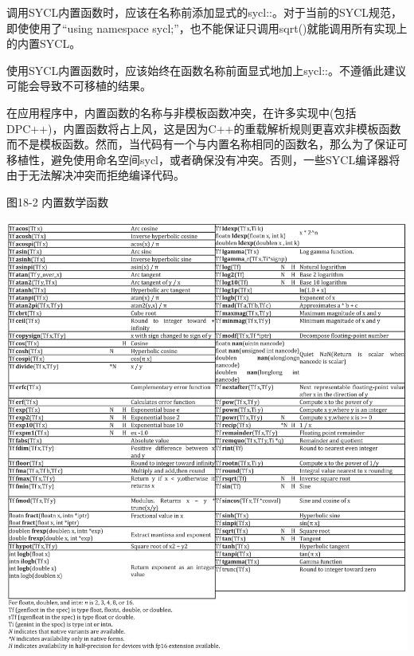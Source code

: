 调用SYCL内置函数时，应该在名称前添加显式的sycl::。对于当前的SYCL规范，即使使用了“using namespace sycl;”，也不能保证只调用sqrt()就能调用所有实现上的内置SYCL。\par

\begin{tcolorbox}[colback=red!5!white,colframe=red!75!black]
使用SYCL内置函数时，应该始终在函数名称前面显式地加上sycl::。不遵循此建议可能会导致不可移植的结果。
\end{tcolorbox}

在应用程序中，内置函数的名称与非模板函数冲突，在许多实现中(包括DPC++)，内置函数将占上风，这是因为C++的重载解析规则更喜欢非模板函数而不是模板函数。然而，当代码有一个与内置名称相同的函数名，那么为了保证可移植性，避免使用命名空间sycl，或者确保没有冲突。否则，一些SYCL编译器将由于无法解决冲突而拒绝编译代码。\par

\hspace*{\fill} \par %
图18-2 内置数学函数
\begin{center}
	\includegraphics[width=1.0\textwidth]{content/chapter-18/images/2}
\end{center}

